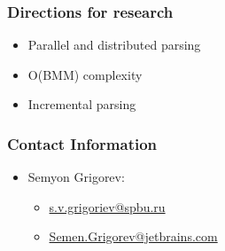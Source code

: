 \documentclass[xcolor=table]{beamer}
\begin{document}
\begin{frame} \frametitle{Directions for research}
\begin{itemize}
\item Parallel and distributed parsing
\item O(BMM) complexity
\item Incremental parsing
\end{itemize}
\end{frame}


\begin{frame}
\frametitle{Contact Information}
\begin{itemize}
  \item Semyon Grigorev:
    \begin{itemize}
      \item \href{mailto:s.v.grigoriev@spbu.ru}{s.v.grigoriev@spbu.ru}
      \item \href{mailto:Semen.Grigorev@jetbrains.com}{Semen.Grigorev@jetbrains.com}
    \end{itemize}

\end{itemize}

\end{frame}
\end{document}
